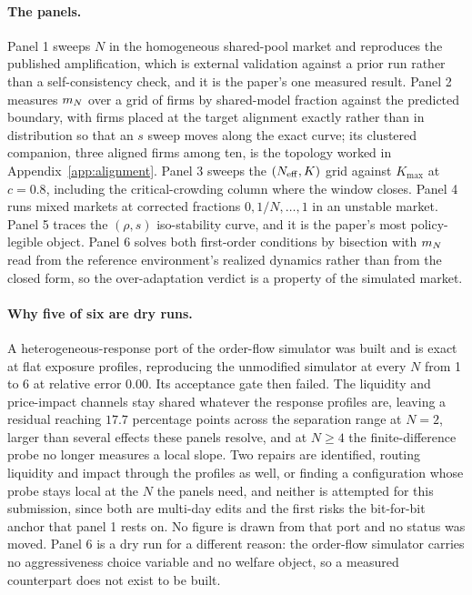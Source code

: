 \paragraph{The panels.} Panel 1 sweeps $N$ in the homogeneous shared-pool market and reproduces the published amplification, which is external validation against a prior run rather than a self-consistency check, and it is the paper's one measured result. Panel 2 measures $m_N$ over a grid of firms by shared-model fraction against the predicted boundary, with firms placed at the target alignment exactly rather than in distribution so that an $s$ sweep moves along the exact curve; its clustered companion, three aligned firms among ten, is the topology worked in Appendix~\ref{app:alignment}. Panel 3 sweeps the $(N_{\mathrm{eff}}, K)$ grid against $K_{\max}$ at $c = 0.8$, including the critical-crowding column where the window closes. Panel 4 runs mixed markets at corrected fractions $0, 1/N, \ldots, 1$ in an unstable market. Panel 5 traces the $(\rho, s)$ iso-stability curve, and it is the paper's most policy-legible object. Panel 6 solves both first-order conditions by bisection with $m_N$ read from the reference environment's realized dynamics rather than from the closed form, so the over-adaptation verdict is a property of the simulated market.

\paragraph{Why five of six are dry runs.} A heterogeneous-response port of the order-flow simulator was built and is exact at flat exposure profiles, reproducing the unmodified simulator at every $N$ from 1 to 6 at relative error $0.00$. Its acceptance gate then failed. The liquidity and price-impact channels stay shared whatever the response profiles are, leaving a residual reaching $17.7$ percentage points across the separation range at $N=2$, larger than several effects these panels resolve, and at $N \geq 4$ the finite-difference probe no longer measures a local slope. Two repairs are identified, routing liquidity and impact through the profiles as well, or finding a configuration whose probe stays local at the $N$ the panels need, and neither is attempted for this submission, since both are multi-day edits and the first risks the bit-for-bit anchor that panel 1 rests on. No figure is drawn from that port and no status was moved. Panel 6 is a dry run for a different reason: the order-flow simulator carries no aggressiveness choice variable and no welfare object, so a measured counterpart does not exist to be built.

